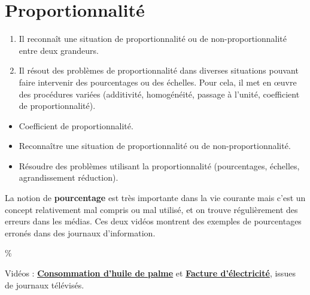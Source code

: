 \themaD
\graphicspath{{../../S16_Proportionnalite/Images/}}

\chapter{Proportionnalité}
\label{S16}


\begin{autoeval}
   \small
   \begin{enumerate}
      \item Il reconnaît une situation de proportionnalité ou de non-proportionnalité entre deux grandeurs.
      \item Il résout des problèmes de proportionnalité dans diverses situations pouvant faire intervenir des pourcentages ou des échelles. Pour cela, il met en œuvre des procédures variées (additivité, homogénéité, passage à l’unité, coefficient de proportionnalité).
   \end{enumerate}
\end{autoeval}

\begin{prerequis}
   \begin{itemize}
     \item Coefficient de proportionnalité.
     \item[\com] Reconnaître une situation de proportionnalité ou de non-proportionnalité.
     \item[\com] Résoudre des problèmes utilisant la proportionnalité (pourcentages, échelles, agrandissement réduction).
   \end{itemize}
\end{prerequis}

\vfill

\begin{debat} 
   La notion de {\bf pourcentage} est très importante dans la vie courante mais c'est un concept relativement mal compris ou mal utilisé, et on trouve régulièrement des erreurs dans les médias. Ces deux vidéos montrent des exemples de pourcentages erronés dans des journaux d'information. \\
   \begin{center}
      \textcolor{B1}{\fontsize{70}{80}\selectfont \%}
   \end{center}
   \bigskip
   \begin{cadre}[B2][J4]
      \begin{center}
         Vidéos : \href{https://www.yout-ube.com/watch?v=ibWzdm_05zs}{\bf Consommation d'huile de palme} et \href{https://www.youtube.com/watch?v=gLbsxj8mv-U}{\bf Facture d'électricité}, issues de journaux télévisés.
      \end{center}
   \end{cadre}
\end{debat}


